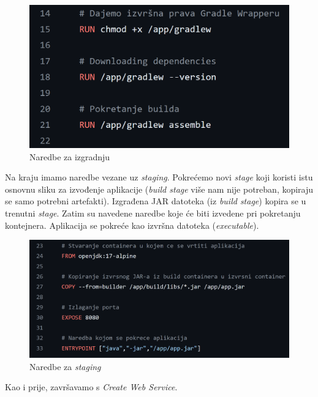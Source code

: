 			\begin{figure}[H]
				\includegraphics[scale=0.6]{slike/dockerfile_run.PNG} 
				\centering
				\caption{Naredbe za izgradnju}
				\label{dockerfile_run}
			\end{figure}
			
			Na kraju imamo naredbe vezane uz \textit{staging}. Pokrećemo novi \textit{stage} koji koristi istu osnovnu sliku za izvođenje aplikacije (\textit{build stage} više nam nije potreban, kopiraju se samo potrebni artefakti). Izgrađena JAR datoteka (iz \textit{build stage}) kopira se u trenutni \textit{stage}. Zatim su navedene naredbe koje će biti izvedene pri pokretanju kontejnera. Aplikacija se pokreće kao izvršna datoteka (\textit{executable}).
			
			\begin{figure}[H]
				\includegraphics[scale=0.45]{slike/dockerfile_stage.PNG} 
				\centering
				\caption{Naredbe za \textit{staging}}
				\label{dockerfile_stage}
			\end{figure}
			
			Kao i prije, završavamo s \textit{Create Web Service}.
			
			\eject 
